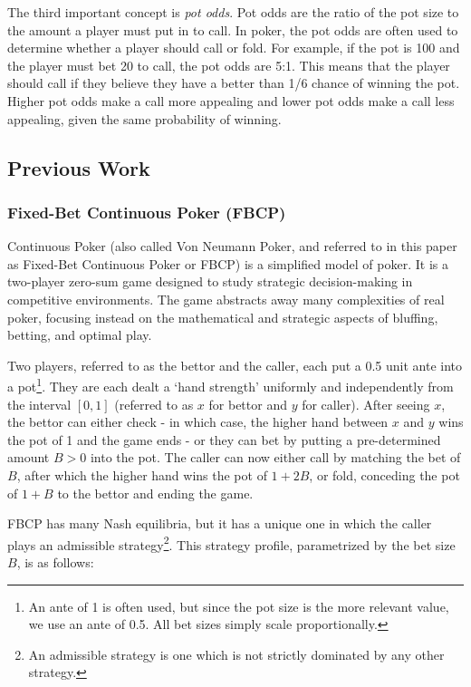 \documentclass[../../main/main.tex]{subfiles}
\begin{document}
The third important concept is \textit{pot odds}. Pot odds are the ratio of the pot size to the amount a player must put in to call. In poker, the pot odds are often used to determine whether a player should call or fold. For example, if the pot is 100 and the player must bet 20 to call, the pot odds are 5:1. This means that the player should call if they believe they have a better than 1/6 chance of winning the pot. Higher pot odds make a call more appealing and lower pot odds make a call less appealing, given the same probability of winning. 

\subsection{Previous Work}

\subsubsection{Fixed-Bet Continuous Poker (FBCP)}

Continuous Poker (also called Von Neumann Poker, and referred to in this paper as Fixed-Bet Continuous Poker or FBCP) is a simplified model of poker. It is a two-player zero-sum game designed to study strategic decision-making in competitive environments. The game abstracts away many complexities of real poker, focusing instead on the mathematical and strategic aspects of bluffing, betting, and optimal play.

\begin{definition}[FBCP]
Two players, referred to as the bettor and the caller, each put a 0.5 unit ante into a pot\footnote{An ante of 1 is often used, but since the pot size is the more relevant value, we use an ante of 0.5. All bet sizes simply scale proportionally.}. They are each dealt a `hand strength' uniformly and independently from the interval $[0, 1]$ (referred to as $x$ for bettor and $y$ for caller). After seeing $x$, the bettor can either check - in which case, the higher hand between $x$ and $y$ wins the pot of 1 and the game ends - or they can bet by putting a pre-determined amount $B > 0$ into the pot. The caller can now either call by matching the bet of $B$, after which the higher hand wins the pot of $1+2B$, or fold, conceding the pot of $1+B$ to the bettor and ending the game.
\end{definition}

FBCP has many Nash equilibria, but it has a unique one in which the caller plays an admissible strategy\footnote{An admissible strategy is one which is not strictly dominated by any other strategy.}. This strategy profile, parametrized by the bet size $B$, is as follows:
\end{document}
